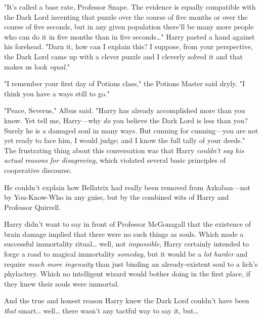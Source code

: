 "It's called a base rate, Professor Snape. The evidence is equally compatible 
with the Dark Lord inventing that puzzle over the course of five months or over 
the course of five seconds, but in any given population there'll be many more 
people who can do it in five months than in five seconds{\ldots}" Harry pasted 
a hand against his forehead. "Darn it, how can I explain this? I suppose, from 
your perspective, the Dark Lord came up with a clever puzzle and I cleverly 
solved it and that makes us look \emph{equal}."

"I remember your first day of Potions class," the Potions Master said dryly. "I 
think you have a ways still to go."

"Peace, Severus," Albus said. "Harry has already accomplished more than you 
know. Yet tell me, Harry---why \emph{do} you believe the Dark Lord is less than 
you? Surely he is a damaged soul in many ways. But cunning for cunning---you 
are not yet ready to face him, I would judge; and I know the full tally of your 
deeds."
\sbreak
The frustrating thing about this conversation was that Harry \emph{couldn't say 
his actual reasons for disagreeing,} which violated several basic principles of 
cooperative discourse.

He couldn't explain how Bellatrix had really been removed from Azkaban---not by 
You-Know-Who in any guise, but by the combined wits of Harry and Professor 
Quirrell.

Harry didn't want to say in front of Professor McGonagall that the existence of 
brain damage implied that there were no such things as souls. Which made a 
successful immortality ritual{\ldots} well, not \emph{impossible,} Harry 
certainly intended to forge a road to magical immortality \emph{someday}, but 
it would be a \emph{lot harder} and require \emph{much more ingenuity} than 
just binding an already-existent soul to a lich's phylactery. Which no 
intelligent wizard would bother doing in the first place, if they knew their 
souls were immortal.

And the true and honest reason Harry knew the Dark Lord couldn't have been 
\emph{that} smart{\ldots} well{\ldots} there wasn't any tactful way to say it, 
but{\ldots}

